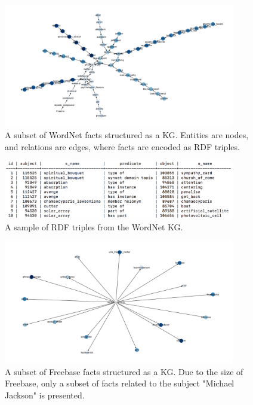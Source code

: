 \begin{figure}
   	\centering
    	\includegraphics[width=0.9\textwidth, height=0.5\textwidth]{Wordnet}
	\captionsetup{justification=centering}
	\caption{A subset of WordNet facts structured as a KG. Entities are nodes, and relations are edges, where facts are encoded as RDF triples.}
\end{figure}

\begin{figure}
   	\centering
    	\includegraphics[width=0.9\textwidth, height=0.2\textwidth]{wordnet_fact_sample}
	\captionsetup{justification=centering}
	\caption{A sample of RDF triples from the WordNet KG.}
\end{figure}

\begin{figure}[H]
   	\centering
    	\includegraphics[width=0.9\textwidth, height=0.5\textwidth]{Freebase}
	\captionsetup{justification=centering}
	\caption{A subset of Freebase facts structured as a KG. Due to the size of Freebase, only a subset of facts related to the subject "Michael Jackson" is presented.}
\end{figure}

